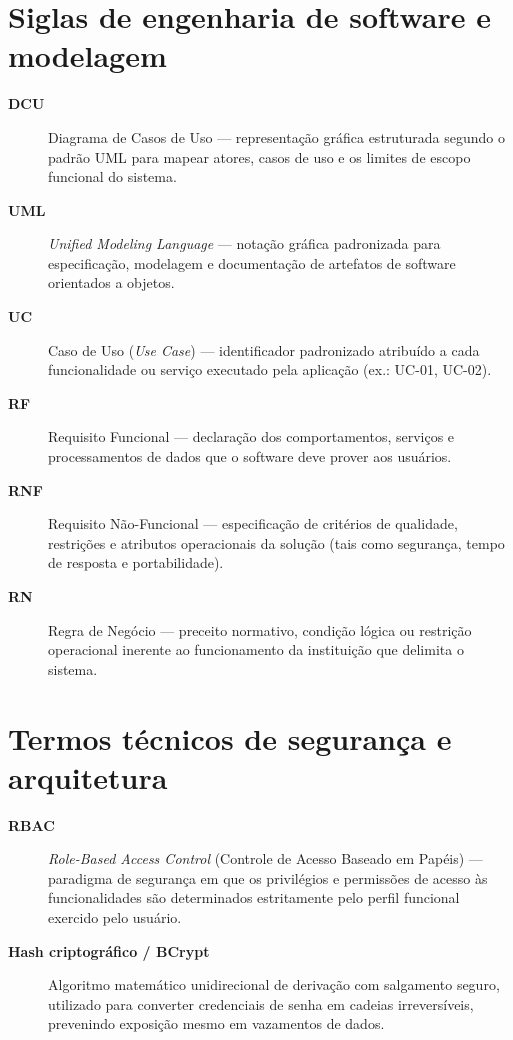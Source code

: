 \section*{Siglas de engenharia de software e modelagem}

\begin{description}
    \item[\textbf{DCU}] Diagrama de Casos de Uso --- representação gráfica estruturada segundo o padrão UML para mapear atores, casos de uso e os limites de escopo funcional do sistema.
    \item[\textbf{UML}] \textit{Unified Modeling Language} --- notação gráfica padronizada para especificação, modelagem e documentação de artefatos de software orientados a objetos.
    \item[\textbf{UC}] Caso de Uso (\textit{Use Case}) --- identificador padronizado atribuído a cada funcionalidade ou serviço executado pela aplicação (ex.: UC-01, UC-02).
    \item[\textbf{RF}] Requisito Funcional --- declaração dos comportamentos, serviços e processamentos de dados que o software deve prover aos usuários.
    \item[\textbf{RNF}] Requisito Não-Funcional --- especificação de critérios de qualidade, restrições e atributos operacionais da solução (tais como segurança, tempo de resposta e portabilidade).
    \item[\textbf{RN}] Regra de Negócio --- preceito normativo, condição lógica ou restrição operacional inerente ao funcionamento da instituição que delimita o sistema.
\end{description}

\section*{Termos técnicos de segurança e arquitetura}

\begin{description}
    \item[\textbf{RBAC}] \textit{Role-Based Access Control} (Controle de Acesso Baseado em Papéis) --- paradigma de segurança em que os privilégios e permissões de acesso às funcionalidades são determinados estritamente pelo perfil funcional exercido pelo usuário.
    \item[\textbf{Hash criptográfico / BCrypt}] Algoritmo matemático unidirecional de derivação com salgamento seguro, utilizado para converter credenciais de senha em cadeias irreversíveis, prevenindo exposição mesmo em vazamentos de dados.
\end{description}

